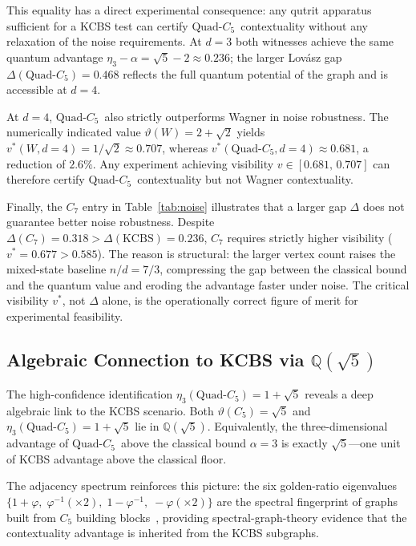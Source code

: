 \documentclass[aps,pra,twocolumn,superscriptaddress,longbibliography,floatfix]{revtex4-2}
\newcommand{\vt}{\vartheta}
\newcommand{\al}{\alpha}
\newcommand{\De}{\Delta}
\newcommand{\QC}{\ensuremath{\text{Quad-}C_5}}
\begin{document}
This equality has a direct experimental consequence: any qutrit apparatus
sufficient for a KCBS test can certify \QC\ contextuality without any
relaxation of the noise requirements.
At $d=3$ both witnesses achieve the same quantum advantage $\eta_3-\al=\sqrt{5}-2\approx0.236$;
the larger Lov\'{a}sz gap $\De(\QC)=0.468$ reflects the full
quantum potential of the graph and is accessible at $d=4$.

At $d=4$, \QC\ also strictly outperforms Wagner in noise robustness.
The numerically indicated value $\vt(W)=2+\sqrt{2}$ yields
$v^*(W,d{=}4)=1/\sqrt{2}\approx0.707$,
whereas $v^*(\QC,d{=}4)\approx0.681$, a reduction of $2.6\%$.
Any experiment achieving visibility $v\in[0.681,\,0.707]$ can therefore
certify \QC\ contextuality but not Wagner contextuality.

Finally, the $C_7$ entry in Table~\ref{tab:noise} illustrates that a larger
gap $\De$ does not guarantee better noise robustness.
Despite $\De(C_7)=0.318>\De(\text{KCBS})=0.236$, $C_7$ requires strictly
higher visibility ($v^*=0.677>0.585$).
The reason is structural: the larger vertex count raises the mixed-state
baseline $n/d=7/3$, compressing the gap between the classical bound and
the quantum value and eroding the advantage faster under noise.
The critical visibility $v^*$, not $\De$ alone, is the operationally
correct figure of merit for experimental feasibility.

\subsection{Algebraic Connection to KCBS via $\mathbb{Q}(\sqrt{5})$}

The high-confidence identification $\eta_3(\QC)=1+\sqrt{5}$
reveals a deep algebraic link to the KCBS scenario.
Both $\vt(C_5)=\sqrt{5}$ and $\eta_3(\QC)=1+\sqrt{5}$ lie in
$\mathbb{Q}(\sqrt{5})$.
Equivalently, the three-dimensional advantage of \QC\ above
the classical bound $\al=3$ is exactly $\sqrt{5}$---one unit of KCBS
advantage above the classical floor.

The adjacency spectrum reinforces this picture: the six golden-ratio
eigenvalues $\{1+\varphi,\; \varphi^{-1}(\times 2),\; 1-\varphi^{-1},\;
-\varphi(\times 2)\}$ are the spectral fingerprint of graphs built from
$C_5$ building blocks~\cite{Cvetkovic1980}, providing spectral-graph-theory
evidence that the contextuality advantage is inherited from the KCBS
subgraphs.

\end{document}
